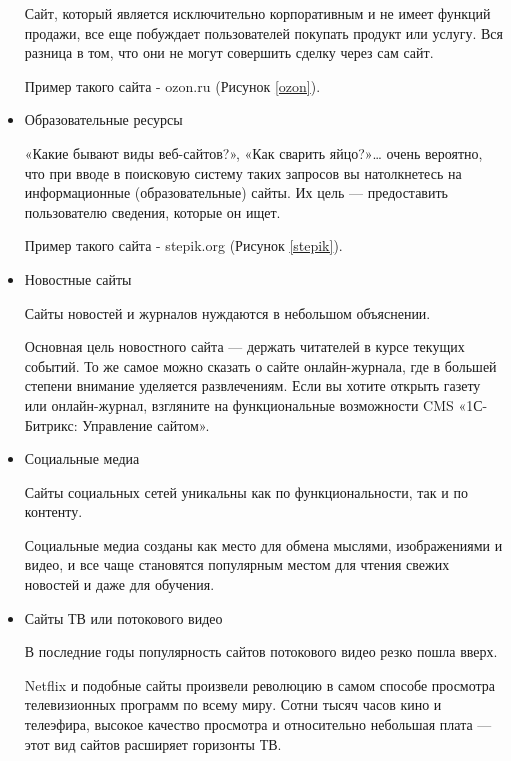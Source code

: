 \begin{itemize}
	Сайт, который является исключительно корпоративным и не имеет функций продажи, все еще побуждает пользователей покупать продукт или услугу. Вся разница в том, что они не могут совершить сделку через сам сайт.

    Пример такого сайта - ozon.ru \cite{ozon} (Рисунок \ref{ozon}).

	\item Образовательные ресурсы

	«Какие бывают виды веб-сайтов?», «Как сварить яйцо?»… очень вероятно, что при вводе в поисковую систему таких запросов вы натолкнетесь на информационные (образовательные) сайты. Их цель — предоставить пользователю сведения, которые он ищет.

    Пример такого сайта - stepik.org \cite{stepik} (Рисунок \ref{stepik}).

	\item Новостные сайты

	Сайты новостей и журналов нуждаются в небольшом объяснении.

	Основная цель новостного сайта — держать читателей в курсе текущих событий. То же самое можно сказать о сайте онлайн-журнала, где в большей степени внимание уделяется развлечениям. Если вы хотите открыть газету или онлайн-журнал, взгляните на функциональные возможности CMS «1С-Битрикс: Управление сайтом».

	\item Социальные медиа

	Сайты социальных сетей уникальны как по функциональности, так и по контенту.

	Социальные медиа созданы как место для обмена мыслями, изображениями и видео, и все чаще становятся популярным местом для чтения свежих новостей и даже для обучения.

	\item Сайты ТВ или потокового видео

	В последние годы популярность сайтов потокового видео резко пошла вверх.

	Netflix и подобные сайты произвели революцию в самом способе просмотра телевизионных программ по всему миру. Сотни тысяч часов кино и телеэфира, высокое качество просмотра и относительно небольшая плата — этот вид сайтов расширяет горизонты ТВ.
\end{itemize}

